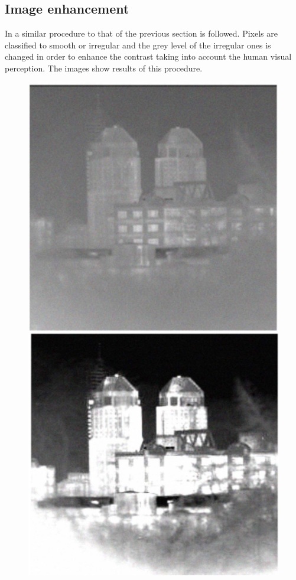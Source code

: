 \documentclass[oneside,a4paper,english,links,12pt]{article}
\begin{document}
\subsection{Image enhancement}
In \cite{Yu2012} a similar procedure to that of the previous section is followed. Pixels are classified to smooth or irregular and the grey level of the irregular ones is changed in order to enhance the contrast taking into account the human visual perception. The images show results of this procedure.
\begin{figure}[htb]
\centering
\includegraphics[scale=0.15]{imagenes/enhance}
\includegraphics[scale=0.15]{imagenes/enhanceeq}

\end{figure}
\end{document}
